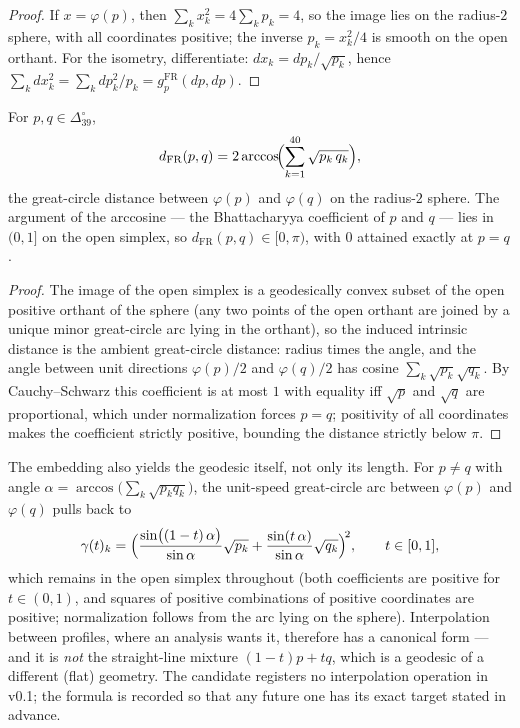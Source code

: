 \begin{proof}
If $x = \varphi(p)$, then $\sum_k x_k^2 = 4 \sum_k p_k = 4$, so the
image lies on the radius-$2$ sphere, with all coordinates positive; the
inverse $p_k = x_k^2 / 4$ is smooth on the open orthant. For the
isometry, differentiate: $dx_k = dp_k / \sqrt{p_k}$, hence
$\sum_k dx_k^2 = \sum_k dp_k^2 / p_k = g^{\mathrm{FR}}_p(dp, dp)$.
\end{proof}

\begin{corollary}\label{ch06:cor:distance}
For $p, q \in \Delta_{39}^{\circ}$,
\[
d_{\mathrm{FR}}(p, q)
 = 2 \arccos\!\Bigl( \sum_{k=1}^{40} \sqrt{p_k\, q_k} \Bigr),
\]
the great-circle distance between $\varphi(p)$ and $\varphi(q)$ on the
radius-$2$ sphere. The argument of the arccosine --- the Bhattacharyya
coefficient of $p$ and $q$ --- lies in $(0, 1]$ on the open simplex, so
$d_{\mathrm{FR}}(p, q) \in [0, \pi)$, with $0$ attained exactly at
$p = q$.
\end{corollary}

\begin{proof}
The image of the open simplex is a geodesically convex subset of the
open positive orthant of the sphere (any two points of the open orthant
are joined by a unique minor great-circle arc lying in the orthant), so
the induced intrinsic distance is the ambient great-circle distance:
radius times the angle, and the angle between unit directions
$\varphi(p)/2$ and $\varphi(q)/2$ has cosine
$\sum_k \sqrt{p_k}\sqrt{q_k}$. By Cauchy--Schwarz this coefficient is at
most $1$ with equality iff $\sqrt{p}$ and $\sqrt{q}$ are proportional,
which under normalization forces $p = q$; positivity of all coordinates
makes the coefficient strictly positive, bounding the distance strictly
below $\pi$.
\end{proof}

\begin{remark}\label{ch06:rem:geodesic}
The embedding also yields the geodesic itself, not only its length. For
$p \ne q$ with angle
$\alpha = \arccos\bigl(\sum_k \sqrt{p_k q_k}\bigr)$, the unit-speed
great-circle arc between $\varphi(p)$ and $\varphi(q)$ pulls back to
\[
\gamma(t)_k
 = \Bigl(
 \frac{\sin\bigl((1 - t)\,\alpha\bigr)}{\sin \alpha} \sqrt{p_k}
 + \frac{\sin(t\,\alpha)}{\sin \alpha} \sqrt{q_k}
 \Bigr)^{\!2},
 \qquad t \in [0, 1],
\]
which remains in the open simplex throughout (both coefficients are
positive for $t \in (0,1)$, and squares of positive combinations of
positive coordinates are positive; normalization follows from the arc
lying on the sphere). Interpolation between profiles, where an analysis
wants it, therefore has a canonical form --- and it is \emph{not}
the straight-line mixture $(1-t)p + tq$, which is a geodesic of a
different (flat) geometry. The candidate registers no interpolation
operation in v0.1; the formula is recorded so that any future one has
its exact target stated in advance.
\end{remark}

